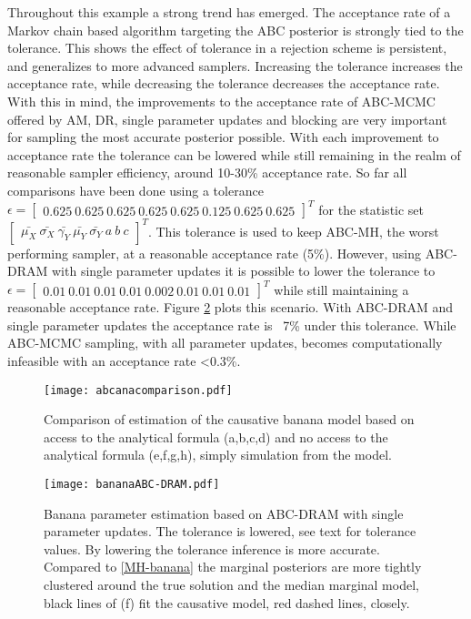 Throughout this example a strong trend has emerged. The acceptance rate of a Markov chain based algorithm targeting the ABC posterior is strongly tied to the tolerance. This shows the effect of tolerance in a rejection scheme is persistent, and generalizes to more advanced samplers. Increasing the tolerance increases the acceptance rate, while decreasing the tolerance decreases the acceptance rate. With this in mind, the improvements to the acceptance rate of ABC-MCMC offered by AM, DR, single parameter updates and blocking are very important for sampling the most accurate posterior possible. With each improvement to acceptance rate the tolerance can be lowered while still remaining in the realm of reasonable sampler efficiency, around 10-30\% acceptance rate. So far all comparisons have been done using a tolerance $\epsilon =\begin{bmatrix}
0.625\ 0.625\ 0.625\ 0.625\ 0.625\ 0.125\ 0.625\ 0.625
\end{bmatrix}^T$ 
for the statistic set $\begin{bmatrix}
\bar{\mu_X}\ \bar{\sigma_X}\ \bar{\gamma_Y}\ \bar{\mu_Y}\ \bar{\sigma_Y}\ a\ b\ c
\end{bmatrix}^T$. This tolerance is used to keep ABC-MH, the worst performing sampler, at a reasonable acceptance rate (5\%). However, using ABC-DRAM with single parameter updates it is possible to lower the tolerance to 
$\epsilon = \begin{bmatrix}
0.01\ 0.01\ 0.01\ 0.01\ 0.002\ 0.01\ 0.01\ 0.01
\end{bmatrix}^T$
while still maintaining a reasonable acceptance rate. Figure \ref{best-banana} plots this scenario. With ABC-DRAM and single parameter updates the acceptance rate is ~7\% under this tolerance. While ABC-MCMC sampling, with all parameter updates, becomes computationally infeasible with an acceptance rate <0.3\%.

\begin{figure}[H]
\centering
\texttt{[image: abcanacomparison.pdf]}
\caption{Comparison of estimation of the causative banana model based on access to the analytical formula (a,b,c,d) and no access to the analytical formula (e,f,g,h), simply simulation from the model.}
\label{the-comparison}
\end{figure}

\begin{figure}[H]
\centering
\texttt{[image: bananaABC-DRAM.pdf]}
\caption{Banana parameter estimation based on ABC-DRAM with single parameter updates. The tolerance is lowered, see text for tolerance values. By lowering the tolerance inference is more accurate. Compared to \ref{MH-banana} the marginal posteriors are more tightly clustered around the true solution and the median marginal model, black lines of (f) fit the causative model, red dashed lines, closely.}
\label{best-banana}
\end{figure}